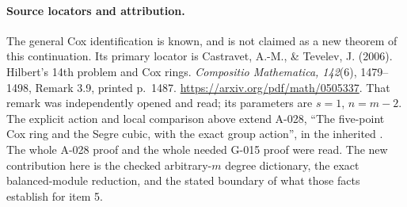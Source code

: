\paragraph{Source locators and attribution.}
The general Cox identification is known, and is not claimed
as a new theorem of this continuation.  Its primary locator is
Castravet, A.-M., \& Tevelev, J. (2006).
Hilbert's 14th problem and Cox rings.
\emph{Compositio Mathematica, 142}(6), 1479--1498,
Remark 3.9, printed p.~1487.
\url{https://arxiv.org/pdf/math/0505337}.
That remark was independently opened and read; its parameters
are $s=1$, $n=m-2$.  The explicit action and local comparison
above extend A-028, ``The five-point Cox ring and the Segre
cubic, with the exact group action'', in the inherited
.
The whole A-028 proof and the whole needed G-015 proof were
read.  The new contribution here is the checked arbitrary-$m$
degree dictionary, the exact balanced-module reduction, and
the stated boundary of what those facts establish for item 5.
